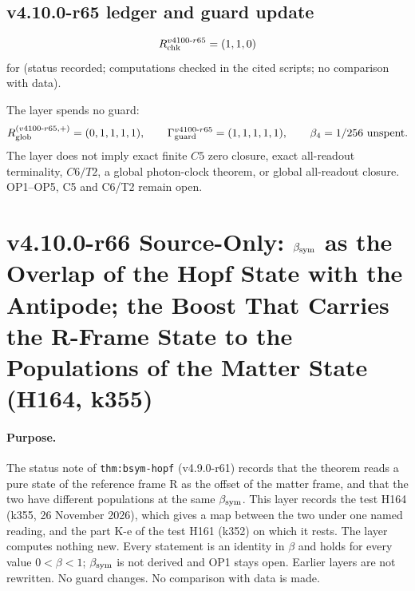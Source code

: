 \subsection*{v4.10.0-r65 ledger and guard update}
\label{subsec:v4100-r65-ledger-guard}

\[
R_{\rm chk}^{v4100\text{-}r65}=(1,1,0)
\]
for (status recorded; computations checked in the cited scripts; no comparison with data).

The layer spends no guard:
\[
R_{\rm glob}^{(v4100\text{-}r65,+)}=(0,1,1,1,1),
\qquad
\Gamma_{\rm guard}^{v4100\text{-}r65}=(1,1,1,1,1),
\qquad
\beta_4=1/256\ \text{unspent}.
\]
The layer does not imply exact finite \(C5\) zero closure, exact all-readout terminality, \(C6/T2\), a global photon-clock theorem,
or global all-readout closure.  OP1--OP5, C5 and C6/T2 remain open.

\clearpage
\section*{v4.10.0-r66 Source-Only: \texorpdfstring{\(\beta_{\rm sym}\)}{beta sym} as the Overlap of the Hopf State with the Antipode; the Boost That Carries the R-Frame State to the Populations of the Matter State (H164, k355)}
\label{sec:v4100-r66-bsym-overlap-boost}

\paragraph{Purpose.}
The status note of \texttt{thm:bsym-hopf} (v4.9.0-r61) records that the theorem reads a pure state of the reference frame R as the offset of the
matter frame, and that the two have different populations at the same \(\beta_{\rm sym}\).  This layer records the test H164 (k355, 26 November
2026), which gives a map between the two under one named reading, and the part K-e of the test H161 (k352) on which it rests.  The layer computes
nothing new.  Every statement is an identity in \(\beta\) and holds for every value \(0<\beta<1\); \(\beta_{\rm sym}\) is not derived and OP1
stays open.  Earlier layers are not rewritten.  No guard changes.  No comparison with data is made.

